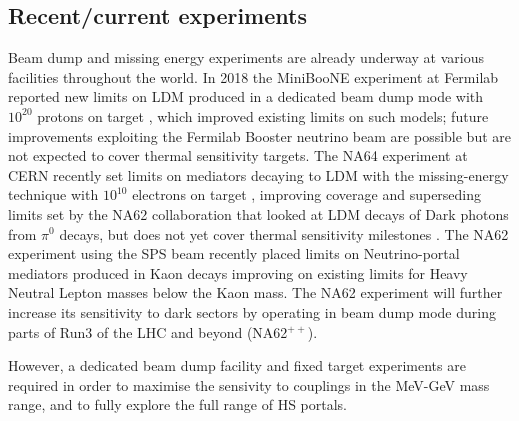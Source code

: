 \documentclass[../report.tex]{subfiles}
\begin{document}

\subsection{Recent/current experiments}
Beam dump and missing energy experiments are already underway at various facilities throughout the world. 
In 2018 the MiniBooNE experiment at Fermilab reported new limits on LDM produced in a dedicated beam dump mode with $10^{20}$ protons on target \cite{Aguilar-Arevalo:2018wea}, which improved existing limits on such models; future improvements exploiting the Fermilab Booster neutrino beam are possible but are not expected to cover thermal  sensitivity targets. The NA64 experiment at CERN recently set limits on mediators decaying to LDM with the missing-energy technique with $10^{10}$ electrons on target \cite{Banerjee:2017hhz}, improving coverage and superseding limits set by the NA62 collaboration that looked at LDM decays of Dark photons from $\pi^0$ decays, but does not yet cover thermal sensitivity milestones \cite{CortinaGil:2019nuo}. The NA62 experiment using the SPS beam recently placed limits on Neutrino-portal mediators produced in Kaon decays improving on existing limits for Heavy Neutral Lepton masses below the Kaon mass. The NA62 experiment will further increase its sensitivity to dark sectors by operating in beam dump mode during parts of Run3 of the LHC and beyond (NA62$^{++}$). %

However, a dedicated beam dump facility and fixed target experiments are required in order to maximise the sensivity to couplings in the MeV-GeV mass range, and to fully explore the full range of HS portals. 
\end{document}
